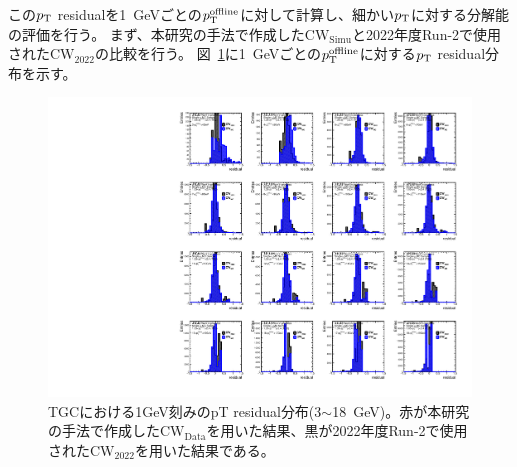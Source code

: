 この$p_{\rm{T}}$ residualを1~GeVごとの$p_{\rm{T}}^{\rm{offline}}$に対して計算し、細かい$p_{\rm{T}}$に対する分解能の評価を行う。
まず、本研究の手法で作成した$\mathrm{CW_{Simu}}$と2022年度Run-2で使用された$\mathrm{CW_{2022}}$の比較を行う。
図~\ref{residual_MC_3_18}に1~GeVごとの$p_{\rm{T}}^{\rm{offline}}$に対する$p_{\rm{T}}$ residual分布を示す。
\begin{figure}[htbp]
  \centering
  \hspace*{-1cm}
  \includegraphics[clip, width=16cm]{fig/5/residual_MC_3_18.pdf}
  \caption{TGCにおける1GeV刻みのpT residual分布(3$\sim$18~GeV)。赤が本研究の手法で作成した$\mathrm{CW_{Data}}$を用いた結果、黒が2022年度Run-2で使用された$\mathrm{CW_{2022}}$を用いた結果である。}
  \label{residual_MC_3_18}
\end{figure}
